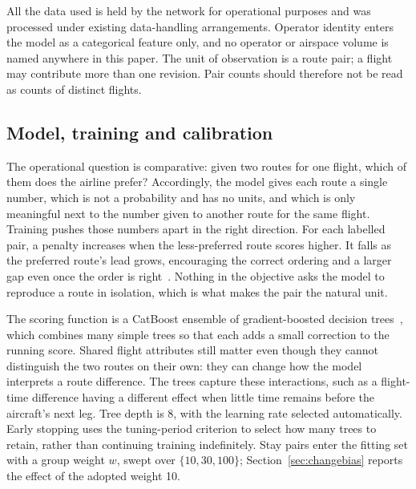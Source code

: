 \documentclass[a4paper,conference]{IEEEtran}
\begin{document}
All the data used is held by the
network for operational purposes and was processed under existing
data-handling arrangements. Operator identity enters the model as a
categorical feature only, and no operator or airspace volume is named
anywhere in this paper. The unit of observation is a route pair; a flight
may contribute more than one revision. Pair counts should therefore not
be read as counts of distinct flights.


\subsection{Model, training and calibration}
\label{sec:proposals}

The operational question is comparative: given two routes for one flight,
which of them does the airline prefer? Accordingly, the model gives each
route a single number, which is not a probability and has no units, and which is only meaningful next to the number given to
another route for the same flight. Training pushes those numbers apart in the right direction. For each
labelled pair, a penalty increases when the less-preferred route scores
higher. It falls as the preferred route's lead grows, encouraging the
correct ordering and a larger gap even once the order is right~\cite{burges2005}. Nothing in the
objective asks the model to reproduce a route in isolation, which is what
makes the pair the natural unit.


The scoring function is a CatBoost ensemble of gradient-boosted decision
trees~\cite{prokhorenkova2017}, which combines many simple trees so that
each adds a small correction to the running score. Shared flight
attributes still matter even though they
cannot distinguish the two routes on their own: they can change how the
model interprets a route difference. The trees capture these interactions, such as a flight-time
difference having a different effect when little time remains before
the aircraft's next leg. Tree depth is 8, with the learning rate
selected automatically. Early stopping uses the tuning-period criterion to select how many
trees to retain, rather than continuing training indefinitely. Stay
pairs enter the fitting set with a group weight $w$, swept over
$\{10, 30, 100\}$; Section~\ref{sec:changebias} reports the effect of the adopted weight 10.
\end{document}
